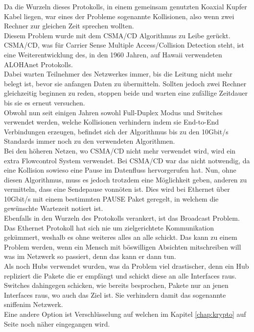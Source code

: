 \documentclass[11pt,a4paper]{report}
\begin{document}
Da die Wurzeln dieses Protokolls, in einem gemeinsam genutzten Koaxial Kupfer Kabel liegen, war eines der Probleme sogenannte Kollisionen, also wenn zwei Rechner zur gleichen Zeit sprechen wollten.\\
Diesem Problem wurde mit dem CSMA/CD Algorithmus zu Leibe gerückt. CSMA/CD, was für Carrier Sense Multiple Access/Collision Detection steht, ist eine Weiterentwicklung des, in den 1960 Jahren, auf Hawaii verwendeten ALOHAnet Protokolls.\\
Dabei warten Teilnehmer des Netzwerkes immer, bis die Leitung nicht mehr belegt ist, bevor sie anfangen Daten zu übermitteln. Sollten jedoch zwei Rechner gleichzeitig beginnen zu reden, stoppen beide und warten eine zufällige Zeitdauer bis sie es erneut versuchen.\\
Obwohl nun seit einigen Jahren sowohl Full-Duplex Modus und Switches verwendet werden, welche Kollisionen verhindern indem sie End-to-End Verbindungen erzeugen, befindet sich der Algorithmus bis zu den 10Gbit/s Standards immer noch zu den verwendeten Algorithmen.\\
Bei den höheren Netzen, wo CSMA/CD nicht mehr verwendet wird, wird ein extra Flowcontrol System verwendet. Bei CSMA/CD war das nicht notwendig, da eine Kollision sowieso eine Pause im Datenfluss hervorgerufen hat. Nun, ohne diesen Algorithmus, muss es jedoch trotzdem eine Möglichkeit geben, anderen zu vermitteln, dass eine Sendepause vonnöten ist. Dies wird bei Ethernet über 10Gbit/s mit einem bestimmten PAUSE Paket geregelt, in welchem die gewünschte Wartezeit notiert ist.\\

Ebenfalls in den Wurzeln des Protokolls verankert, ist das Broadcast Problem.\\
Das Ethernet Protokoll hat sich nie um zielgerichtete Kommunikation gekümmert, weshalb es ohne weiteres alles an alle schickt. Das kann zu einem Problem werden, wenn ein Mensch mit böswilligen Absichten mitschreiben will was im Netzwerk so passiert, denn das kann er dann tun.\\
Als noch Hubs verwendet wurden, was da Problem viel drastischer, denn ein Hub repliziert die Pakete die er empfängt und schickt diese an alle Interfaces raus.\\
Switches dahingegen schicken, wie bereits besprochen, Pakete nur an jenen Interfaces raus, wo auch das Ziel ist. Sie verhindern damit das sogenannte \glqq sniffen\grqq im Netzwerk.\\
Eine andere Option ist Verschlüsselung auf welchen im Kapitel \ref{chap:krypto} auf Seite \pageref{chap:krypto} noch näher eingegangen wird.\\
\end{document}
